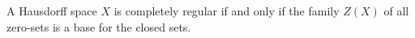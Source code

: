 A Hausdorff space $X$ is completely regular if and only if the family $Z(X)$ of all zero-sets is a base for the closed sets.
